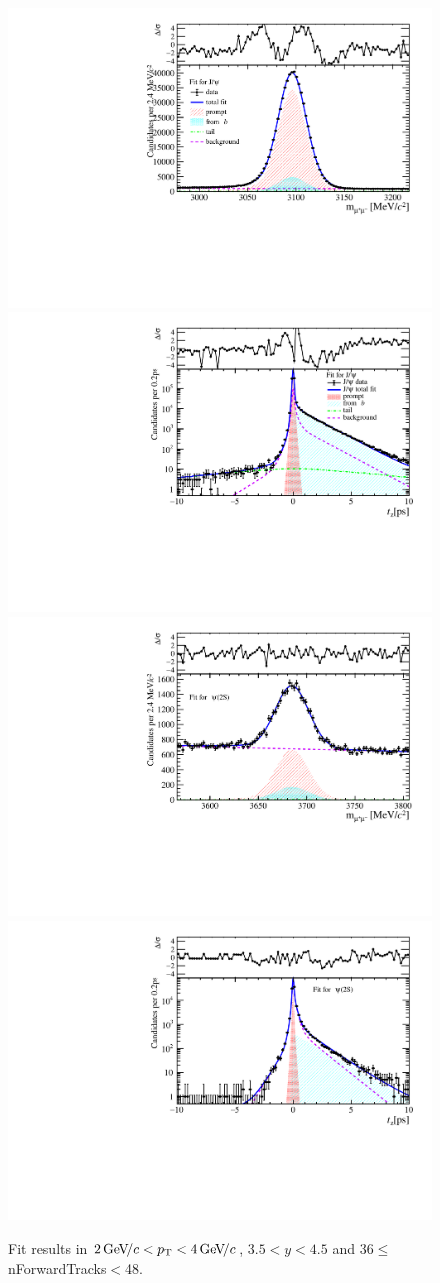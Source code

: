 \begin{figure}[H]
\begin{center}
\includegraphics[width=0.47\linewidth]{pdf/Jpsi/drawmassF/n4y3pt2.pdf}
\includegraphics[width=0.47\linewidth]{pdf/Jpsi/2DFitF/n4y3pt2.pdf}
\vspace*{-0.5cm}
\includegraphics[width=0.47\linewidth]{pdf/Psi2S/drawmassF/n4y3pt2.pdf}
\includegraphics[width=0.47\linewidth]{pdf/Psi2S/2DFitF/n4y3pt2.pdf}
\vspace*{-0.5cm}
\end{center}
\caption{Fit results in $2\text{\,Ge\kern -0.1em V\!/}c<p_{\mathrm{T}}<4\text{\,Ge\kern -0.1em V\!/}c$, $3.5<y<4.5$ and 36$\leq$nForwardTracks$<$48.}
\label{Fitn4y3pt2}
\end{figure}
